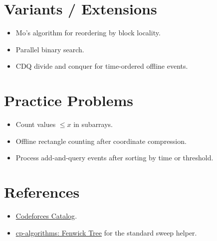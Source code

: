 \section*{Variants / Extensions}

\begin{itemize}
  \item Mo's algorithm for reordering by block locality.
  \item Parallel binary search.
  \item CDQ divide and conquer for time-ordered offline events.
\end{itemize}

\section*{Practice Problems}

\begin{itemize}
  \item Count values \(\le x\) in subarrays.
  \item Offline rectangle counting after coordinate compression.
  \item Process add-and-query events after sorting by time or threshold.
\end{itemize}

\section*{References}

\begin{itemize}
  \item \href{https://codeforces.com/catalog}{Codeforces Catalog}.
  \item \href{https://cp-algorithms.com/data_structures/fenwick.html}{cp-algorithms: Fenwick Tree} for the standard sweep helper.
\end{itemize}
